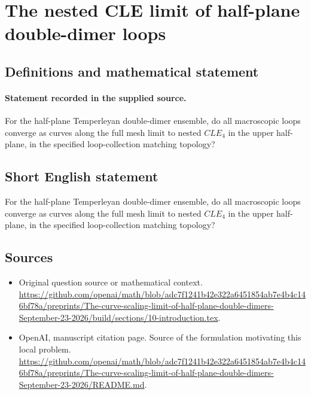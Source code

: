 \documentclass[11pt]{article}
\begin{document}
\section*{The nested CLE limit of half-plane double-dimer loops}\label{statement}
\subsection{Definitions and mathematical statement}
\paragraph{Statement recorded in the supplied source.}
For the half-plane Temperleyan double-dimer ensemble, do all macroscopic loops converge as curves along the full mesh limit to nested $CLE_4$ in the upper half-plane, in the specified loop-collection matching topology?
\subsection{Short English statement}
For the half-plane Temperleyan double-dimer ensemble, do all macroscopic loops converge as curves along the full mesh limit to nested $CLE_4$ in the upper half-plane, in the specified loop-collection matching topology?
\subsection{Sources}
\begin{itemize}
\item[S1] Original question source or mathematical context.
\url{https://github.com/openai/math/blob/adc7f1241b42e322a6451854ab7e4b4c146bf78a/preprints/The-curve-scaling-limit-of-half-plane-double-dimers-September-23-2026/build/sections/10-introduction.tex}.
\item[S2] OpenAI, manuscript citation page. Source of the formulation motivating this local problem.
\url{https://github.com/openai/math/blob/adc7f1241b42e322a6451854ab7e4b4c146bf78a/preprints/The-curve-scaling-limit-of-half-plane-double-dimers-September-23-2026/README.md}.
\end{itemize}
\end{document}
